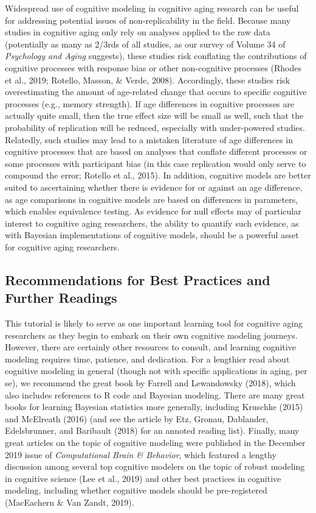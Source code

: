 \documentclass[
  english,
  ,man,floatsintext]{apa6}
\begin{document}
Widespread use of cognitive modeling in cognitive aging research can be useful for addressing potential issues of non-replicability in the field. Because many studies in cognitive aging only rely on analyses applied to the raw data (potentially as many as 2/3rds of all studies, as our survey of Volume 34 of \emph{Psychology and Aging} suggests), these studies risk conflating the contributions of cognitive processes with response bias or other non-cognitive processes (Rhodes et al., 2019; Rotello, Masson, \& Verde, 2008). Accordingly, these studies risk overestimating the amount of age-related change that occurs to specific cognitive processes (e.g., memory strength). If age differences in cognitive processes are actually quite small, then the true effect size will be small as well, such that the probability of replication will be reduced, especially with under-powered studies. Relatedly, such studies may lead to a mistaken literature of age differences in cognitive processes that are based on analyses that conflate different processes or some processes with participant bias (in this case replication would only serve to compound the error; Rotello et al., 2015). In addition, cognitive models are better suited to ascertaining whether there is evidence for or against an age difference, as age comparisons in cognitive models are based on differences in parameters, which enables equivalence testing. As evidence for null effects may of particular interest to cognitive aging researchers, the ability to quantify such evidence, as with Bayesian implementations of cognitive models, should be a powerful asset for cognitive aging researchers.

\hypertarget{recommendations-for-best-practices-and-further-readings}{%
\subsection{Recommendations for Best Practices and Further Readings}\label{recommendations-for-best-practices-and-further-readings}}

This tutorial is likely to serve as one important learning tool for cognitive aging researchers as they begin to embark on their own cognitive modeling journeys. However, there are certainly other resources to consult, and learning cognitive modeling requires time, patience, and dedication. For a lengthier read about cognitive modeling in general (though not with specific applications in aging, per se), we recommend the great book by Farrell and Lewandowsky (2018), which also includes references to R code and Bayesian modeling. There are many great books for learning Bayesian statistics more generally, including Kruschke (2015) and McElreath (2016) (and see the article by Etz, Gronau, Dablander, Edelsbrunner, and Baribault (2018) for an annoted reading list). Finally, many great articles on the topic of cognitive modeling were published in the December 2019 issue of \emph{Computational Brain \& Behavior}, which featured a lengthy discussion among several top cognitive modelers on the topic of robust modeling in cognitive science (Lee et al., 2019) and other best practices in cognitive modeling, including whether cognitive models should be pre-registered (MacEachern \& Van Zandt, 2019).
\end{document}
